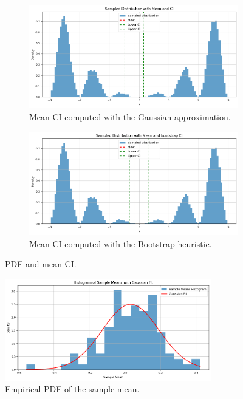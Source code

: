 \documentclass[a4paper]{article}
\begin{document}
\begin{figure}[htbp]
  \centering
  \begin{subfigure}[t]{0.45\textwidth}
    \centering
    \includegraphics[width=\textwidth]{images/mean-CI.png}
    \caption{Mean CI computed with the Gaussian
    approximation.}\label{fig:mean-1}
  \end{subfigure}
  \hfill
  \begin{subfigure}[t]{0.45\textwidth}
    \centering
    \includegraphics[width=\textwidth]{images/mean-Boot-CI.png}
    \caption{Mean CI computed with the Bootstrap heuristic.}\label{fig:mean-2}
  \end{subfigure}
  \caption{PDF and mean CI.}\label{fig:mean-CI}
\end{figure}

\begin{figure}[htbp]
  \centering
  \includegraphics[width=0.8\textwidth]{images/CLT3.png}
  \caption{Empirical PDF of the sample mean.}\label{fig:CLT}
\end{figure}
\end{document}
